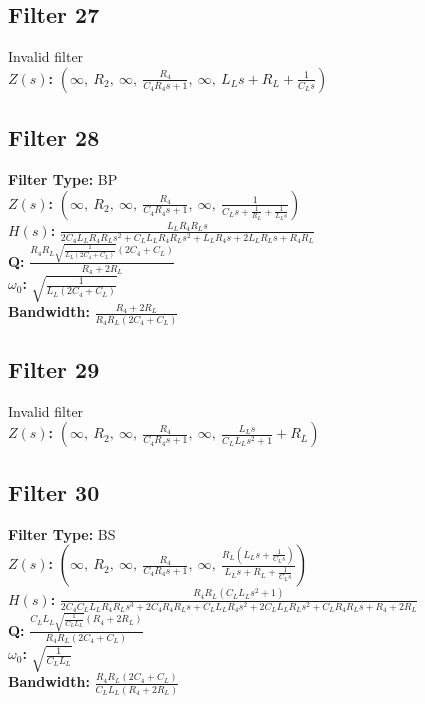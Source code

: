 \documentclass{article}
\begin{document}
\subsection*{Filter 27}
Invalid filter \\ 
\textbf{$Z(s)$:} $\left( \infty, \  R_{2}, \  \infty, \  \frac{R_{4}}{C_{4} R_{4} s + 1}, \  \infty, \  L_{L} s + R_{L} + \frac{1}{C_{L} s}\right)$ \\ 
\subsection*{Filter 28}
\textbf{Filter Type:} BP \\ 
\textbf{$Z(s)$:} $\left( \infty, \  R_{2}, \  \infty, \  \frac{R_{4}}{C_{4} R_{4} s + 1}, \  \infty, \  \frac{1}{C_{L} s + \frac{1}{R_{L}} + \frac{1}{L_{L} s}}\right)$ \\ 
\textbf{$H(s)$:} $\frac{L_{L} R_{4} R_{L} s}{2 C_{4} L_{L} R_{4} R_{L} s^{2} + C_{L} L_{L} R_{4} R_{L} s^{2} + L_{L} R_{4} s + 2 L_{L} R_{L} s + R_{4} R_{L}}$ \\ 
\textbf{Q:} $\frac{R_{4} R_{L} \sqrt{\frac{1}{L_{L} \left(2 C_{4} + C_{L}\right)}} \left(2 C_{4} + C_{L}\right)}{R_{4} + 2 R_{L}}$ \\ 
\textbf{$\omega_0$:} $\sqrt{\frac{1}{L_{L} \left(2 C_{4} + C_{L}\right)}}$ \\ 
\textbf{Bandwidth:} $\frac{R_{4} + 2 R_{L}}{R_{4} R_{L} \left(2 C_{4} + C_{L}\right)}$ \\ 
\subsection*{Filter 29}
Invalid filter \\ 
\textbf{$Z(s)$:} $\left( \infty, \  R_{2}, \  \infty, \  \frac{R_{4}}{C_{4} R_{4} s + 1}, \  \infty, \  \frac{L_{L} s}{C_{L} L_{L} s^{2} + 1} + R_{L}\right)$ \\ 
\subsection*{Filter 30}
\textbf{Filter Type:} BS \\ 
\textbf{$Z(s)$:} $\left( \infty, \  R_{2}, \  \infty, \  \frac{R_{4}}{C_{4} R_{4} s + 1}, \  \infty, \  \frac{R_{L} \left(L_{L} s + \frac{1}{C_{L} s}\right)}{L_{L} s + R_{L} + \frac{1}{C_{L} s}}\right)$ \\ 
\textbf{$H(s)$:} $\frac{R_{4} R_{L} \left(C_{L} L_{L} s^{2} + 1\right)}{2 C_{4} C_{L} L_{L} R_{4} R_{L} s^{3} + 2 C_{4} R_{4} R_{L} s + C_{L} L_{L} R_{4} s^{2} + 2 C_{L} L_{L} R_{L} s^{2} + C_{L} R_{4} R_{L} s + R_{4} + 2 R_{L}}$ \\ 
\textbf{Q:} $\frac{C_{L} L_{L} \sqrt{\frac{1}{C_{L} L_{L}}} \left(R_{4} + 2 R_{L}\right)}{R_{4} R_{L} \left(2 C_{4} + C_{L}\right)}$ \\ 
\textbf{$\omega_0$:} $\sqrt{\frac{1}{C_{L} L_{L}}}$ \\ 
\textbf{Bandwidth:} $\frac{R_{4} R_{L} \left(2 C_{4} + C_{L}\right)}{C_{L} L_{L} \left(R_{4} + 2 R_{L}\right)}$ \\ 
\end{document}
